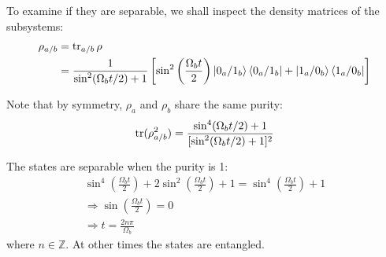 \begin{parts}
	To examine if they are separable, we shall inspect the density matrices of the subsystems:
	\begin{align*}
		\rho_{a/b} &= \textnormal{tr}_{a/b}\,\rho \\
		&= \frac{1}{\sin^2(\Omega_b t/2) + 1} \left[\sin^2\left(\frac{\Omega_b t}{2}\right) \ket{0_a/1_b} \bra{0_a/1_b} + \ket{1_a/0_b} \bra{1_a/0_b}\right]
	\end{align*}
	
	Note that by symmetry, $\rho_a$ and $\rho_b$ share the same purity:
	\begin{equation*}
		\textnormal{tr}(\rho_{a/b}^2) = \frac{\sin^4 (\Omega_b t/2) + 1}{[\sin^2(\Omega_b t/2) + 1]^2}
	\end{equation*}
	
	The states are separable when the purity is 1:
	\begin{gather*}
		\sin^4 \left(\frac{\Omega_b t}{2}\right) + 2\sin^2 \left(\frac{\Omega_b t}{2}\right) + 1 = \sin^4 \left(\frac{\Omega_b t}{2}\right) + 1 \\
		\Rightarrow \sin\left(\frac{\Omega_b t}{2}\right) = 0 \\
		\Rightarrow t = \frac{2n\pi}{\Omega_b}
	\end{gather*}
	where $n\in\mathbb{Z}$. At other times the states are entangled.
\end{parts}